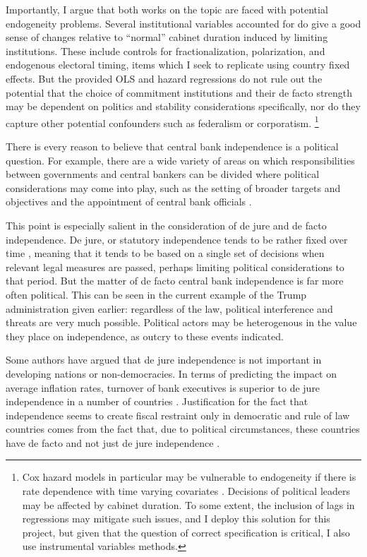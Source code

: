 \documentclass{article}
\begin{document}
    Importantly, I argue that both works on the topic are faced with potential endogeneity problems. Several institutional variables accounted for do give a good sense of changes relative to “normal” cabinet duration induced by limiting institutions. These include controls for fractionalization, polarization, and endogenous electoral timing, items which I seek to replicate using country fixed effects. But the provided OLS and hazard regressions do not rule out the potential that the choice of commitment institutions and their de facto strength may be dependent on politics and stability considerations specifically, nor do they capture other potential confounders such as federalism or corporatism. \footnote{Cox hazard models in particular may be vulnerable to endogeneity if there is rate dependence with time varying covariates \citep{goodliffe_hazards_2003}. Decisions of political leaders may be affected by cabinet duration. To some extent, the inclusion of lags in regressions may mitigate such issues, and I deploy this solution for this project, but given that the question of correct specification is critical, I also use instrumental variables methods.}

    There is every reason to believe that central bank independence is a political question. For example, there are a wide variety of areas on which responsibilities between governments and central bankers can be divided where political considerations may come into play, such as the setting of broader targets and objectives and the appointment of central bank officials \citep{eijffinger_political_1996}. 
    
    This point is especially salient in the consideration of de jure and de facto independence. De jure, or statutory independence tends to be rather fixed over time \citep{garriga_central_2016}, meaning that it tends to be based on a single set of decisions when relevant legal measures are passed, perhaps limiting political considerations to that period. But the matter of de facto central bank independence is far more often political. This can be seen in the current example of the Trump administration given earlier: regardless of the law, political interference and threats are very much possible. Political actors may be heterogenous in the value they place on independence, as outcry to these events indicated.
   
    Some authors have argued that de jure independence is not important in developing nations or non-democracies. In terms of predicting the impact on average inflation rates, turnover of bank executives is superior to de jure independence in a number of countries \citep{cukierman_measuring_1992}. Justification for the fact that independence seems to create fiscal restraint only in democratic and rule of law countries comes from the fact that, due to political circumstances, these countries have de facto and not just de jure independence \citep{bodea_central_2017}.
   
\end{document}
